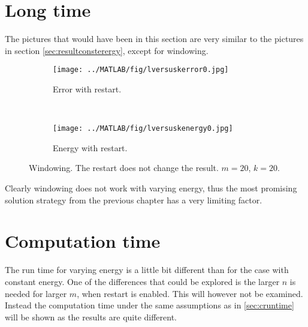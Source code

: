 \section{Long time}%
The pictures that would have been in this section are very similar to the pictures in section \ref{sec:resultconsterergy}, except for windowing.
\begin{figure}[H]
        \centering
        \begin{subfigure}[b]{0.45\textwidth}
                \texttt{[image: ../MATLAB/fig/lversuskerror0.jpg]}
                \caption{ Error with restart. }
                \label{fig:lversuskerror0}
        \end{subfigure}
		~
		\begin{subfigure}[b]{0.45\textwidth}
                \texttt{[image: ../MATLAB/fig/lversuskenergy0.jpg]}
                \caption{ Energy with restart. }
                \label{fig:lversuskenergy0}
        \end{subfigure}
                \caption{ Windowing. The restart does not change the result. $m = 20$, $k= 20$.}
        \label{fig:lversuskenergy}
\end{figure}
Clearly windowing does not work with varying energy, thus the most promising solution strategy from the previous chapter has a very limiting factor.\\


\section{Computation time} %
The run time for varying energy is a little bit different than for the case with constant energy. One of the differences that could be explored is the larger $n$ is needed for larger $m$, when restart is enabled. This will however not be examined. Instead the computation time under the same assumptions as in \ref{sec:cruntime} will be shown as the results are quite different. 
